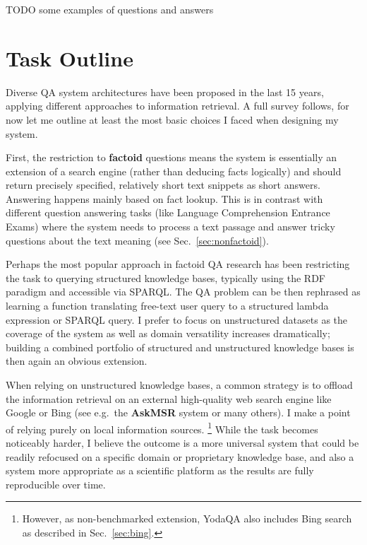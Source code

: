 TODO some examples of questions and answers

\section{Task Outline}

Diverse QA system architectures have been proposed in the last 15 years,
applying different approaches to information retrieval.  A full survey
follows, for now let me outline at least the most basic choices I faced
when designing my system.

First, the restriction to \textbf{factoid} questions means the system
is essentially an extension of a search engine (rather than deducing
facts logically) and should return precisely specified, relatively short
text snippets as short answers.  Answering happens mainly based on fact
lookup.  This is in contrast with different question answering tasks
(like Language Comprehension Entrance Exams) where the system needs to
process a text passage and answer tricky questions about the text meaning
(see Sec.~\ref{sec:nonfactoid}).

Perhaps the most popular approach in factoid QA research has been restricting
the task to querying structured knowledge bases, typically using the
RDF paradigm and accessible via SPARQL\@.  The QA problem can
be then rephrased as learning a function translating free-text user query
to a structured lambda expression or SPARQL query. \citep{Semantic2013Berant, Semantic2014Bordes}
I prefer to focus on unstructured datasets as the coverage of the system
as well as domain versatility increases dramatically; building a combined
portfolio of structured and unstructured knowledge bases
is then again an obvious extension.

When relying on unstructured knowledge bases, a common strategy is to offload
the information retrieval on an external high-quality web search engine
like Google or Bing (see e.g.\ the \textbf{AskMSR} system \citep{AskMSR}
or many others).
I make a point of relying purely on local information sources.%
\footnote{However, as non-benchmarked extension, YodaQA also includes
	Bing search as described in Sec.~\ref{sec:bing}.}
While the task becomes noticeably harder,
I believe the outcome is a more
universal system that could be readily refocused on a specific domain
or proprietary knowledge base, and also a system more appropriate as
a scientific platform as the results are fully reproducible over time.


